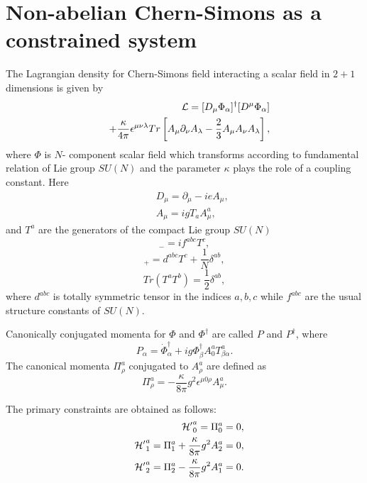 \documentclass[a4paper,12pt]{article}
\begin{document}
\section{ Non-abelian Chern-Simons as a constrained system}
 The Lagrangian density for Chern-Simons field
interacting a scalar field in $2+1$ dimensions is given by
\begin{eqnarray}
&&{\cal L}=
[D_{\mu}{\Phi}_{\alpha}]^{\dag}[{D^{\mu}}\Phi_{\alpha}]\nonumber\\&&+
{\frac{\kappa}{4\pi}}{\epsilon}^{{\mu}{\nu}{\lambda}}
Tr\left[A_{\mu}{\partial_{\nu}}A_{\lambda}
-\frac{2}{3}A_{\mu}A_{\nu}A_{\lambda}\right],
\end{eqnarray}
where $\Phi$ is $N$- component scalar field which transforms
according to fundamental relation of Lie group $SU(N)$ and the
parameter $\kappa$ plays the role of a coupling constant. Here
\begin{eqnarray} &&D_{\mu}= \partial_{\mu} -i eA_{\mu},\\
&&A_{\mu} = i gT_{a} A^{a}_{\mu},
\end{eqnarray}
and $T^{a}$ are the generators of the compact Lie group $SU(N)$
\begin{equation}
[T^{a}, T^{b}]_{-}= i f^{abc}T^{c},
\end{equation}
\begin{equation}
[T^{a}, T^{b}]_{+} = d^{abc}T^{c} + \frac{1}{N}\delta^{ab},
\end{equation}
\begin{equation}
Tr(T^{a}T^{b})=\frac{1}{2}\delta^{ab},
\end{equation}
where $d^{abc}$ is totally symmetric tensor in the indices $a, b,
c$ while $f^{abc}$ are the usual structure constants of $SU(N)$.

Canonically conjugated momenta for $\Phi$ and $\Phi^{\dag}$ are
called $P$ and $P^{\dag}$, where
\begin{equation}
P_{\alpha} = {\dot \Phi}_{\alpha}^{\dag} + ig
{\Phi}_{\beta}^{\dag}A_{0}^{a}T_{\beta\alpha}^{a}.
\end{equation}
The canonical momenta $\Pi_{\rho}^{a}$ conjugated to
$A_{\rho}^{a}$ are defined as
\begin{equation}
\Pi_{\rho}^{a}= -\frac{\kappa}{8\pi}g^{2} {\epsilon}^{\mu 0
\rho}A_{\mu}^{a}.
\end{equation}

 The primary constraints are obtained as follows:
\begin{eqnarray}
&&{\cal H'}_{0}^{a}= \Pi_{0}^{a} =0,\\
&&{\cal H'}_{1}^{a}=  \Pi_{1}^{a} +
\frac{\kappa}{8\pi}g^{2}A_{2}^{a}=0,\\
&&{\cal H'}_{2}^{a}= \Pi_{2}^{a} -
\frac{\kappa}{8\pi}g^{2}A_{1}^{a}=0.
\end{eqnarray}
\end{document}
